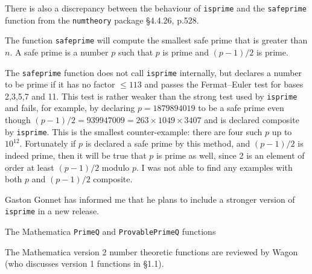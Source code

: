 There is also a discrepancy between the behaviour of {\tt isprime} and the
{\tt safeprime} function from the {\tt numtheory} package \cite{16} \S4.4.26, p.528.

\block
The function {\tt safeprime}
will compute the smallest safe prime that is greater than $n$.
A safe prime is a number $p$ such that $p$ is prime and $(p-1)/2$ is prime.
\endblock

The {\tt safeprime} function does not call {\tt isprime} internally, but
declares a number to be prime if it has no factor $\le 113$ and passes the
Fermat--Euler test for bases 2,3,5,7 and 11.
This test is rather weaker than the strong test used by {\tt isprime} and
fails, for example, by declaring $p = 1879894019$ to be a safe prime even
though $(p-1)/2 = 939947009 = 263 \times 1049 \times 3407$ and is
declared composite by {\tt isprime}.  This is the smallest counter-example:
there are four such $p$ up to $10^{12}$. Fortunately if $p$ is declared a
safe prime by this method, and $(p-1)/2$ is indeed prime, then it will be true
that $p$ is prime as well, since 2 is an element of order at least $(p-1)/2$ modulo $p$.
I was not able to find any examples with both $p$ and $(p-1)/2$ composite.

\medskip

Gaston Gonnet has informed me that he plans to include a stronger version of 
{\tt isprime} in a new release.

\subhead The Mathematica {\tt PrimeQ} and {\tt ProvablePrimeQ} functions \endsubhead

The Mathematica version 2 number theoretic functions are reviewed by Wagon \cite{44}
(who discusses version 1 functions in \cite{43} \S1.1).

